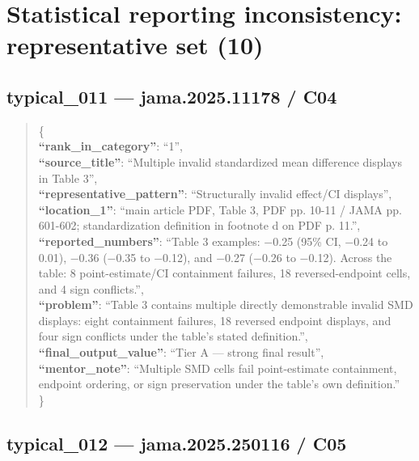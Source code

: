 \documentclass[
  letterpaper,
  9pt]{extreport}
\begin{document}
\hypertarget{statistical-reporting-inconsistency-representative-set-10}{%
\section{Statistical reporting inconsistency: representative set
(10)}\label{statistical-reporting-inconsistency-representative-set-10}}

\hypertarget{typical_011--jama202511178--c04}{%
\subsection{typical\_011 --- jama.2025.11178 /
C04}\label{typical_011--jama202511178--c04}}

\begin{quote}
\{\\
\textbf{``rank\_in\_category''}: ``1'',\\
\textbf{``source\_title''}: ``Multiple invalid standardized mean
difference displays in Table 3'',\\
\textbf{``representative\_pattern''}: ``Structurally invalid effect/CI
displays'',\\
\textbf{``location\_1''}: ``main article PDF, Table 3, PDF pp. 10-11 /
JAMA pp. 601-602; standardization definition in footnote d on PDF p.
11.'',\\
\textbf{``reported\_numbers''}: ``Table 3 examples: −0.25 (95\% CI,
−0.24 to 0.01), −0.36 (−0.35 to −0.12), and −0.27 (−0.26 to −0.12).
Across the table: 8 point-estimate/CI containment failures, 18
reversed-endpoint cells, and 4 sign conflicts.'',\\
\textbf{``problem''}: ``Table 3 contains multiple directly demonstrable
invalid SMD displays: eight containment failures, 18 reversed endpoint
displays, and four sign conflicts under the table's stated
definition.'',\\
\textbf{``final\_output\_value''}: ``Tier A --- strong final result'',\\
\textbf{``mentor\_note''}: ``Multiple SMD cells fail point-estimate
containment, endpoint ordering, or sign preservation under the table's
own definition.''\\
\}
\end{quote}

\hypertarget{typical_012--jama2025250116--c05}{%
\subsection{typical\_012 --- jama.2025.250116 /
C05}\label{typical_012--jama2025250116--c05}}
\end{document}
